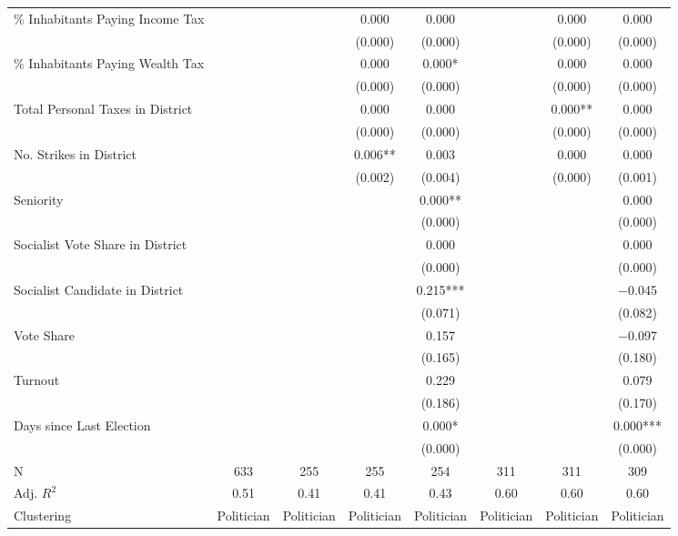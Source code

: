 \begin{table}[!h]
{\begin{threeparttable}
\begin{tabular}[t]{lccccccc}
\% Inhabitants Paying Income Tax &  &  & \num{0.000} & \num{0.000} &  & \num{0.000} & \num{0.000}\\
 &  &  & (\num{0.000}) & (\num{0.000}) &  & (\num{0.000}) & \vphantom{2} (\num{0.000})\\
\% Inhabitants Paying Wealth Tax &  &  & \num{0.000} & \num{0.000}* &  & \num{0.000} & \num{0.000}\\
 &  &  & (\num{0.000}) & (\num{0.000}) &  & (\num{0.000}) & \vphantom{1} (\num{0.000})\\
Total Personal Taxes in District &  &  & \num{0.000} & \num{0.000} &  & \num{0.000}** & \num{0.000}\\
 &  &  & (\num{0.000}) & (\num{0.000}) &  & (\num{0.000}) & (\num{0.000})\\
No. Strikes in District &  &  & \num{0.006}** & \num{0.003} &  & \num{0.000} & \num{0.000}\\
 &  &  & (\num{0.002}) & (\num{0.004}) &  & (\num{0.000}) & (\num{0.001})\\
Seniority &  &  &  & \num{0.000}** &  &  & \num{0.000}\\
 &  &  &  & (\num{0.000}) &  &  & \vphantom{2} (\num{0.000})\\
Socialist Vote Share in District &  &  &  & \num{0.000} &  &  & \num{0.000}\\
 &  &  &  & (\num{0.000}) &  &  & \vphantom{1} (\num{0.000})\\
Socialist Candidate in District &  &  &  & \num{0.215}*** &  &  & \num{-0.045}\\
 &  &  &  & (\num{0.071}) &  &  & (\num{0.082})\\
Vote Share &  &  &  & \num{0.157} &  &  & \num{-0.097}\\
 &  &  &  & (\num{0.165}) &  &  & (\num{0.180})\\
Turnout &  &  &  & \num{0.229} &  &  & \num{0.079}\\
 &  &  &  & (\num{0.186}) &  &  & (\num{0.170})\\
Days since Last Election &  &  &  & \num{0.000}* &  &  & \num{0.000}***\\
 &  &  &  & (\num{0.000}) &  &  & (\num{0.000})\\
\midrule
N & \num{633} & \num{255} & \num{255} & \num{254} & \num{311} & \num{311} & \num{309}\\
Adj. $R^2$ & \num{0.51} & \num{0.41} & \num{0.41} & \num{0.43} & \num{0.60} & \num{0.60} & \num{0.60}\\
Clustering & Politician & Politician & Politician & Politician & Politician & Politician & Politician\\

\end{tabular}
\end{threeparttable}}
\end{table}
